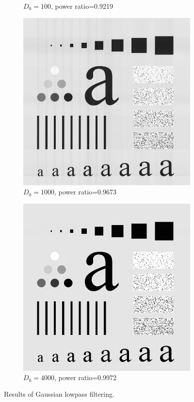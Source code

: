 \begin{figure}[h!]
\begin{subfigure}[b]{0.45\linewidth}
		\caption{$D_0=100$, power ratio=0.9219}
		\label{fig:GLPF_100}
	\end{subfigure}
	\begin{subfigure}[b]{0.45\linewidth}
		\includegraphics[width=\linewidth]{myfigure/p3/GLPF_1000.png}
		\caption{$D_0=1000$, power ratio=0.9673}
		\label{fig:GLPF_1000}
	\end{subfigure}
  	\begin{subfigure}[b]{0.45\linewidth}
		\includegraphics[width=\linewidth]{myfigure/p3/GLPF_4000.png}
		\caption{$D_0=4000$, power ratio=0.9972}
		\label{fig:GLPF_4000}
	\end{subfigure}
  	\caption{Results of Gaussian lowpass filtering.}
  	\label{fig:GLPF}
\end{figure}


